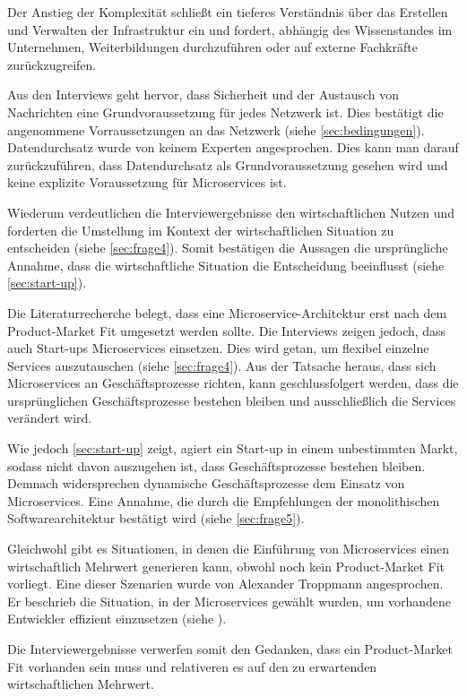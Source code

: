 Der Anstieg der Komplexität schließt ein tieferes Verständnis über das Erstellen und Verwalten der Infrastruktur ein und fordert, abhängig des Wissenstandes im Unternehmen, Weiterbildungen durchzuführen oder auf externe Fachkräfte zurückzugreifen.

\label{sec:netzwerk}
Aus den Interviews geht hervor, dass Sicherheit und der Austausch von Nachrichten eine Grundvoraussetzung für jedes Netzwerk ist. Dies bestätigt die angenommene Vorraussetzungen an das Netzwerk (siehe \cref{sec:bedingungen}). Datendurchsatz wurde von keinem Experten angesprochen. Dies kann man darauf zurückzuführen, dass Datendurchsatz als Grundvoraussetzung gesehen wird und keine explizite Voraussetzung für Microservices ist.

Wiederum verdeutlichen die Interviewergebnisse den wirtschaftlichen Nutzen und forderten die Umstellung im Kontext der wirtschaftlichen Situation zu entscheiden (siehe \cref{sec:frage4}). Somit bestätigen die Aussagen die ursprüngliche Annahme, dass die wirtschaftliche Situation die Entscheidung beeinflusst (siehe \cref{sec:start-up}).

Die Literaturrecherche belegt, dass eine Microservice-Architektur erst nach dem Product-Market Fit umgesetzt werden sollte. Die Interviews zeigen jedoch, dass auch Start-ups Microservices einsetzen. Dies wird getan, um flexibel einzelne Services auszutauschen (siehe \cref{sec:frage4}). Aus der Tatsache heraus, dass sich Microservices an Geschäftsprozesse richten, kann geschlussfolgert werden, dass die ursprünglichen Geschäftsprozesse bestehen bleiben und ausschließlich die Services verändert wird.

Wie jedoch \cref{sec:start-up} zeigt, agiert ein Start-up in einem unbestimmten Markt, sodass nicht davon auszugehen ist, dass Geschäftsprozesse bestehen bleiben. Demnach widersprechen dynamische Geschäftsprozesse dem Einsatz von Microservices. Eine Annahme, die durch die Empfehlungen der monolithischen Softwarearchitektur bestätigt wird (siehe \cref{sec:frage5}).

Gleichwohl gibt es Situationen, in denen die Einführung von Microservices einen wirtschaftlich Mehrwert generieren kann, obwohl noch kein Product-Market Fit vorliegt. Eine dieser Szenarien wurde von Alexander Troppmann angesprochen. Er beschrieb die Situation, in der Microservices gewählt wurden, um vorhandene Entwickler effizient einzusetzen (siehe ).

\label{sec:wirtschaftlich}
Die Interviewergebnisse verwerfen somit den Gedanken, dass ein Product-Market Fit vorhanden sein muss und relativeren es auf den zu erwartenden wirtschaftlichen Mehrwert.

